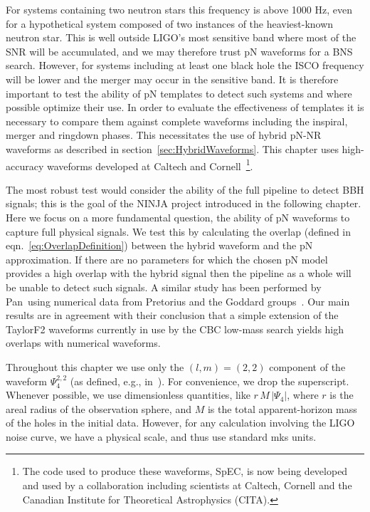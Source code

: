 For systems containing two neutron stars this frequency is above 1000
Hz, even for a hypothetical system composed of two instances of the
heaviest-known neutron star.  This is well outside LIGO's most
sensitive band where most of the SNR will be accumulated, and we may
therefore trust pN waveforms for a BNS search.  However, for systems
including at least one black hole the ISCO frequency will be lower and
the merger may occur in the sensitive band.  It is therefore
important to test the ability of pN templates to detect such systems
and where possible optimize their use.  In order to evaluate the
effectiveness of templates it is necessary to compare them
against complete waveforms including the inspiral, merger and ringdown
phases.  This necessitates the use of hybrid pN-NR waveforms as
described in section~\ref{sec:HybridWaveforms}.  This chapter uses
high-accuracy waveforms developed at Caltech and Cornell~\footnote{The
code used to produce these waveforms, SpEC, is now being developed and
used by a collaboration including scientists at Caltech, Cornell and
the Canadian Institute for Theoretical Astrophysics (CITA).}. 

The most robust test would consider the ability of the full pipeline
to detect BBH signals; this is the goal of the NINJA project
introduced in the following chapter.  Here we focus on a more
fundamental question, the ability of pN waveforms to capture full
physical signals.  We test this by calculating the overlap (defined in
eqn.~\ref{eq:OverlapDefinition}) between the hybrid waveform and the
pN approximation.  If there are no parameters for which the chosen pN
model provides a high overlap with the hybrid signal then the pipeline
as a whole will be unable to detect such signals.  A similar study has
been performed by Pan~\etal using numerical data from Pretorius and
the Goddard groups~\cite{Pan2007}.  Our main results are in agreement
with their conclusion that a simple extension of the TaylorF2
waveforms currently in use by the CBC low-mass search yields high
overlaps with numerical waveforms.

Throughout this chapter we use only the $(l,m)=(2,2)$ component of the
waveform $\Psi_{4}^{2,2}$ (as defined, e.g., in~\cite{Boyle2008a}).
For convenience, we drop the superscript.  Whenever possible, we use
dimensionless quantities, like $r\,M\,\lvert \Psi_{4} \rvert$, where
$r$ is the areal radius of the observation sphere, and $M$ is the
total apparent-horizon mass of the holes in the initial data.
However, for any calculation involving the LIGO noise curve, we have a
physical scale, and thus use standard mks units.  

